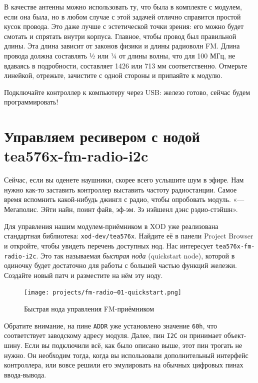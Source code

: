 В качестве антенны можно использовать ту, что была в комплекте с модулем, если она была, но в любом случае с этой задачей отлично справится простой кусок провода. Это даже лучше с эстетической точки зрения: его можно будет смотать и спрятать внутри корпуса. Главное, чтобы провод был правильной длины. Эта длина зависит от законов физики и длины радиоволн FM. Длина провода должна составлять ½ или ¼ от длины волны, что для 100 МГц, не вдаваясь в подробности, составляет 1426 или 713 мм соответственно. Отмерьте линейкой, отрежьте, зачистите с одной стороны и припаяйте к модулю.

Подключайте контроллер к компьютеру через USB: железо готово, сейчас будем программировать!

\section{Управляем ресивером с нодой tea576x-fm-radio-i2c}


Сейчас, если вы оденете наушники, скорее всего услышите шум в эфире. Нам нужно как-то заставить контроллер выставить частоту радиостанции. Самое время вспомнить какой-нибудь джингл с радио, чтобы опробовать модуль.  «— Мегаполис. Эйти найн, поинт файв, эф-эм. Зэ нэйшенл дэнс рэдио-стэйшн».

Для управления нашим модулем-приёмником в XOD уже реализована стандартная библиотека: \texttt{xod-dev/tea576x}. Найдите её в панели Project Browser и откройте, чтобы увидеть перечень доступных нод. Нас интересует \texttt{tea576x-fm-radio-i2c}. Это так называемая \emph{быстрая нода} (quickstart node), которой в одиночку будет достаточно для работы с большей частью функций железки. Создайте новый патч и разместите на нём эту ноду.

\begin{figure}
  \centering
  \texttt{[image: projects/fm-radio--01-quickstart.png]}
  \caption{Быстрая нода управления FM-приёмником}
\end{figure}

Обратите внимание, на пине \texttt{ADDR} уже установлено значение \texttt{60h}, что соответствует заводскому адресу модуля. Далее, пин \texttt{I2C} он принимает объект-шину. Если вы подключили всё, как было описано выше, этот пин трогать не нужно. Он необходим тогда, когда вы использовали дополнительный интерфейс контроллера, или вовсе решили его эмулировать на обычных цифровых пинах ввода-вывода.

